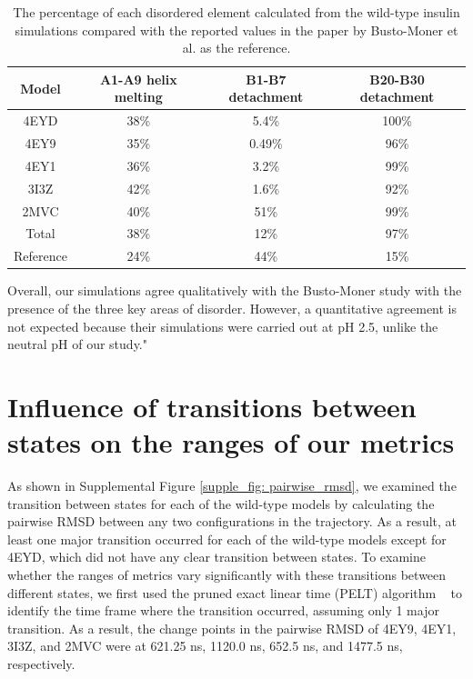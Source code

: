 \documentclass[9pt]{elife}
\begin{document}
\renewcommand{\thetable}{S\arabic{table}}
\begin{table}[H]
\centering
\begin{tabular}{|c|c|c|c|}
\hline
Model & A1-A9 helix melting & B1-B7 detachment & B20-B30 detachment \\ \hline
4EYD  & 38\%             & 5.4\%           & 100\%            \\ \hline
4EY9  & 35\%             & 0.49\%           & 96\%            \\ \hline
4EY1  & 36\%             & 3.2\%           & 99\%            \\ \hline
3I3Z  & 42\%             & 1.6\%           & 92\%            \\ \hline
2MVC  & 40\%             & 51\%          & 99\%             \\ \hline
Total & 38\%             & 12\%          & 97\%            \\ \hline
Reference   & 24\%                & 44\%             & 15\%               \\ \hline
\end{tabular}
\caption{The percentage of each disordered element calculated from the wild-type insulin simulations compared with the reported values in the paper by Busto-Moner et al. as the reference.}
\label{disorder}
\end{table}

Overall, our simulations agree qualitatively with the Busto-Moner study with the presence of the three key areas of disorder. However, a quantitative agreement is not expected because their simulations were carried out at pH 2.5, unlike the neutral pH of our study."

\section{Influence of transitions between states on the ranges of our metrics}
As shown in Supplemental Figure \ref{supple_fig: pairwise_rmsd}, we examined the transition between states for each of the wild-type models by calculating the pairwise RMSD between any two configurations in the trajectory. As a result, at least one major transition occurred for each of the wild-type models except for 4EYD, which did not have any clear transition between states. To examine whether the ranges of metrics vary significantly with these transitions between different states, we first used the pruned exact linear time (PELT) algorithm ~\cite{killick2012optimal} to identify the time frame where the transition occurred, assuming only 1 major transition. As a result, the change points in the pairwise RMSD of 4EY9, 4EY1, 3I3Z, and 2MVC were at 621.25 ns, 1120.0 ns, 652.5 ns, and 1477.5 ns, respectively. 
\end{document}
